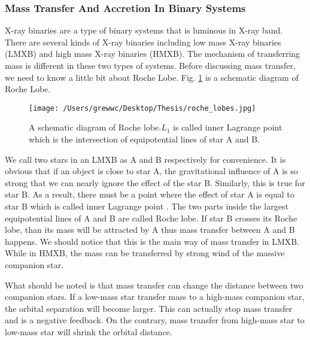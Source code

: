 \documentclass[12pt]{report}
\begin{document}
            \subsubsection{Mass Transfer And Accretion In Binary Systems}
              X-ray binaries are a type of binary systems that is luminous in X-ray band. 
              There are several kinds of X-ray binaries including low mass X-ray binaries 
              (LMXB) and high mass X-ray binaries (HMXB). The mechanism of transferring mass 
              is different in these two types of systems. Before discussing mass 
              transfer, we need to know a little bit about Roche Lobe. Fig. 
              \ref{fig:roche lobe} is a schematic diagram of Roche Lobe.
              \begin{figure}[h]
                \centering
                \texttt{[image: /Users/grewwc/Desktop/Thesis/roche\_lobes.jpg]}
                \caption{A schematic diagram of Roche lobe.\protect $L_{1}$ is called inner 
                          Lagrange point which is the intersection of equipotential lines 
                          of star A and B.}
                \label{fig:roche lobe}
              \end{figure}
              We call two stars in an LMXB as A and B respectively for convenience. It is 
              obvious that if an object is close to star A, the gravitational influence of A 
              is so strong that we can nearly ignore the effect of the star B. Similarly, 
              this is true for star B. As a result, there must be a point where the effect 
              of star A is equal to star B which is called inner Lagrange point 
              \cite{0004-637X-603-1-283}. The two parts inside the largest equipotential 
              lines of A and B are called Roche lobe. If star B crosses
              its Roche lobe, than its mass will be attracted by A thus mass transfer between 
              A and B happens. We should notice that this is the main way of mass transfer in 
              LMXB. While in HMXB, the mass can be transferred by strong wind of the massive 
              companion star. 

              What should be noted is that mass transfer can change the distance between two 
              companion stars. If a low-mass star transfer mass to a high-mass companion star,
              the orbital separation will become larger. This can actually stop mass transfer 
              and is a negative feedback. On the contrary, mass transfer from high-mass star 
              to low-mass star will shrink the orbital distance.
                       
\end{document}
